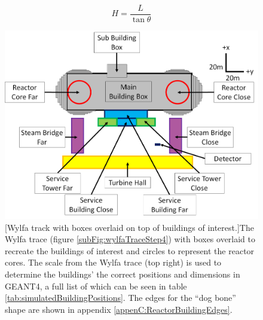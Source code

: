 \begin{equation}
H = \frac{L}{\tan{\theta}}
\label{equ:tanHeightEquation}
\end{equation}

 \begin{figure}[!h]
 \centering
 \includegraphics[width=0.7\linewidth]{Chapter6/Figs/Raster/simulatedAnotatedBuildings.png}
 [Wylfa track with boxes overlaid on top of buildings of interest.]{The Wylfa trace (figure \ref{subFig:wylfaTraceStep4}) with boxes overlaid to recreate the buildings of interest and circles to represent the reactor cores. The scale from the Wylfa trace (top right) is used to determine the buildings' the correct positions and dimensions in GEANT4, a full list of which can be seen in table \ref{tab:simulatedBuildingPositions}. The edges for the ``dog bone'' shape are shown in appendix \ref{appenC:ReactorBuildingEdges}.} 
 \label{fig:simulatedPositions}
\end{figure}



